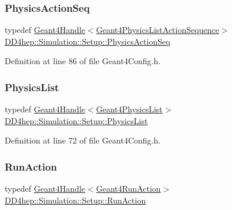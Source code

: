 \subsubsection{\texorpdfstring{Physics\+Action\+Seq}{PhysicsActionSeq}}
{\footnotesize\ttfamily typedef \hyperlink{class_d_d4hep_1_1_simulation_1_1_geant4_handle}{Geant4\+Handle}$<$\hyperlink{class_d_d4hep_1_1_simulation_1_1_geant4_physics_list_action_sequence}{Geant4\+Physics\+List\+Action\+Sequence}$>$ \hyperlink{namespace_d_d4hep_1_1_simulation_1_1_setup_a4a1525b46f6b47a7c7654bf3b79ea3ce}{D\+D4hep\+::\+Simulation\+::\+Setup\+::\+Physics\+Action\+Seq}}



Definition at line 86 of file Geant4\+Config.\+h.

\hypertarget{namespace_d_d4hep_1_1_simulation_1_1_setup_a40c6d28ab3022c7744f6a1f28f38bd72}{}\label{namespace_d_d4hep_1_1_simulation_1_1_setup_a40c6d28ab3022c7744f6a1f28f38bd72} 
\subsubsection{\texorpdfstring{Physics\+List}{PhysicsList}}
{\footnotesize\ttfamily typedef \hyperlink{class_d_d4hep_1_1_simulation_1_1_geant4_handle}{Geant4\+Handle}$<$\hyperlink{class_d_d4hep_1_1_simulation_1_1_geant4_physics_list}{Geant4\+Physics\+List}$>$ \hyperlink{namespace_d_d4hep_1_1_simulation_1_1_setup_a40c6d28ab3022c7744f6a1f28f38bd72}{D\+D4hep\+::\+Simulation\+::\+Setup\+::\+Physics\+List}}



Definition at line 72 of file Geant4\+Config.\+h.

\hypertarget{namespace_d_d4hep_1_1_simulation_1_1_setup_a9a6172ddf65752b351495ec3d99c6379}{}\label{namespace_d_d4hep_1_1_simulation_1_1_setup_a9a6172ddf65752b351495ec3d99c6379} 
\subsubsection{\texorpdfstring{Run\+Action}{RunAction}}
{\footnotesize\ttfamily typedef \hyperlink{class_d_d4hep_1_1_simulation_1_1_geant4_handle}{Geant4\+Handle}$<$\hyperlink{class_d_d4hep_1_1_simulation_1_1_geant4_run_action}{Geant4\+Run\+Action}$>$ \hyperlink{namespace_d_d4hep_1_1_simulation_1_1_setup_a9a6172ddf65752b351495ec3d99c6379}{D\+D4hep\+::\+Simulation\+::\+Setup\+::\+Run\+Action}}



